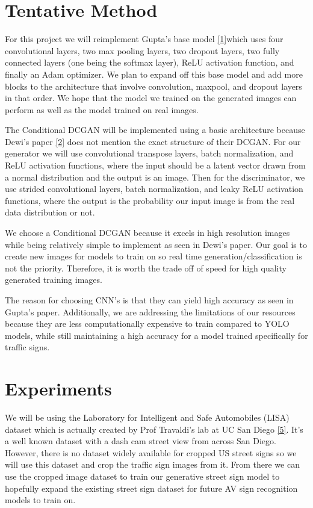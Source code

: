 \documentclass{article}
\begin{document}
\section{Tentative Method}

\qquad For this project we will reimplement Gupta's base model \hyperref[Gupta]{[1]}which uses four convolutional layers, two max pooling layers, two dropout layers, two fully connected layers (one being the softmax layer), ReLU activation function, and finally an Adam optimizer. We plan to expand off this base model and add more blocks to the architecture that involve convolution, maxpool, and dropout layers in that order. We hope that the model we trained on the generated images can perform as well as the model trained on real images.

\qquad The Conditional DCGAN will be implemented using a basic architecture because Dewi’s paper \hyperref[Dewi]{[2]} does not mention the exact structure of their DCGAN. For our generator we will use convolutional transpose layers, batch normalization, and ReLU activation functions, where the input should be a latent vector drawn from a normal distribution and the output is an image. Then for the discriminator, we use strided convolutional layers, batch normalization, and leaky ReLU activation functions, where the output is the probability our input image is from the real data distribution or not. 

\qquad We choose a Conditional DCGAN because it excels in high resolution images while being relatively simple to implement as seen in Dewi’s paper. Our goal is to create new images for models to train on so real time generation/classification is not the priority. Therefore, it is worth the trade off of speed for high quality generated training images. 

\qquad The reason for choosing CNN’s is that they can yield high accuracy as seen in Gupta’s paper. Additionally, we are addressing the limitations of our resources because they are less computationally expensive to train compared to YOLO models, while still maintaining a high accuracy for a model trained specifically for traffic signs.

\section{Experiments}

\qquad We will be using the Laboratory for Intelligent and Safe Automobiles (LISA) dataset which is actually created by Prof Travaldi’s lab at UC San Diego \hyperref[LISA]{[5]}. It’s a well known dataset with a dash cam street view from across San Diego. However, there is no dataset widely available for cropped US street signs so we will use this dataset and crop the traffic sign images from it. From there we can use the cropped image dataset to train our generative street sign model to hopefully expand the existing street sign dataset for future AV sign recognition models to train on. 
\end{document}
